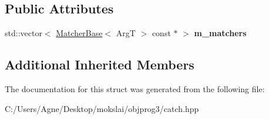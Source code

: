 \subsection*{Public Attributes}
\begin{DoxyCompactItemize}
\item 
\mbox{\label{struct_catch_1_1_matchers_1_1_impl_1_1_match_any_of_a1fb1119e6110dc15b8d5262ec0aeddd5}} 
std\+::vector$<$ \mbox{\hyperlink{struct_catch_1_1_matchers_1_1_impl_1_1_matcher_base}{Matcher\+Base}}$<$ ArgT $>$ const  $\ast$ $>$ {\bfseries m\+\_\+matchers}
\end{DoxyCompactItemize}
\subsection*{Additional Inherited Members}


The documentation for this struct was generated from the following file\+:\begin{DoxyCompactItemize}
\item 
C\+:/\+Users/\+Agne/\+Desktop/mokslai/objprog3/catch.\+hpp\end{DoxyCompactItemize}
